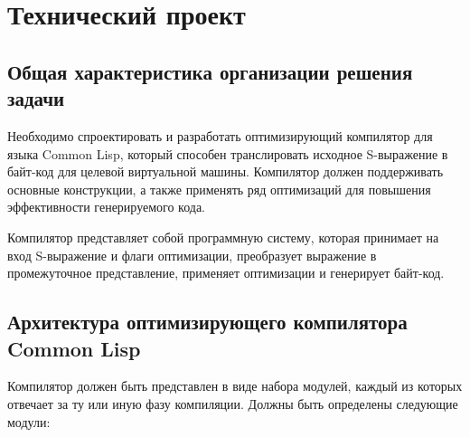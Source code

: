 \section{Технический проект}

\subsection{Общая характеристика организации решения задачи}

Необходимо спроектировать и разработать оптимизирующий компилятор для языка Common Lisp, который способен транслировать исходное S-выражение в байт-код для целевой виртуальной машины. Компилятор должен поддерживать основные конструкции, а также применять ряд оптимизаций для повышения эффективности генерируемого кода.

Компилятор представляет собой программную систему, которая принимает на вход S-выражение и флаги оптимизации, преобразует выражение в промежуточное представление, применяет оптимизации и генерирует байт-код.

\subsection{Архитектура оптимизирующего компилятора Common Lisp}

Компилятор должен быть представлен в виде набора модулей, каждый из которых отвечает за ту или иную фазу компиляции. Должны быть определены следующие модули:


